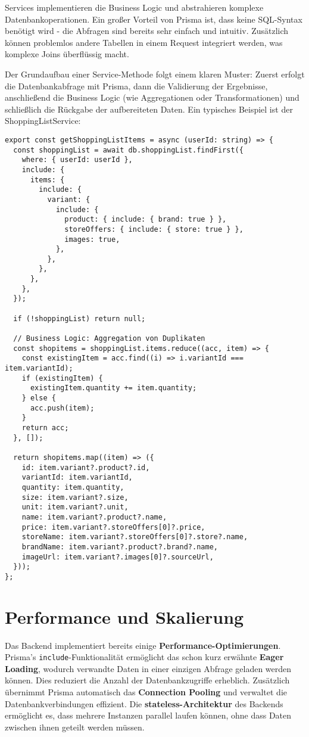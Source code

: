 Services implementieren die Business Logic und abstrahieren komplexe Datenbankoperationen. Ein großer Vorteil von Prisma ist, dass keine SQL-Syntax benötigt wird - die Abfragen sind bereits sehr einfach und intuitiv. Zusätzlich können problemlos andere Tabellen in einem Request integriert werden, was komplexe Joins überflüssig macht.

Der Grundaufbau einer Service-Methode folgt einem klaren Muster: Zuerst erfolgt die Datenbankabfrage mit Prisma, dann die Validierung der Ergebnisse, anschließend die Business Logic (wie Aggregationen oder Transformationen) und schließlich die Rückgabe der aufbereiteten Daten. Ein typisches Beispiel ist der ShoppingListService:

\begin{lstlisting}[style=typescriptstyle,caption={Service-Layer Beispiel}]
export const getShoppingListItems = async (userId: string) => {
  const shoppingList = await db.shoppingList.findFirst({
    where: { userId: userId },
    include: {
      items: {
        include: {
          variant: {
            include: {
              product: { include: { brand: true } },
              storeOffers: { include: { store: true } },
              images: true,
            },
          },
        },
      },
    },
  });

  if (!shoppingList) return null;

  // Business Logic: Aggregation von Duplikaten
  const shopitems = shoppingList.items.reduce((acc, item) => {
    const existingItem = acc.find((i) => i.variantId === item.variantId);
    if (existingItem) {
      existingItem.quantity += item.quantity;
    } else {
      acc.push(item);
    }
    return acc;
  }, []);

  return shopitems.map((item) => ({
    id: item.variant?.product?.id,
    variantId: item.variantId,
    quantity: item.quantity,
    size: item.variant?.size,
    unit: item.variant?.unit,
    name: item.variant?.product?.name,
    price: item.variant?.storeOffers[0]?.price,
    storeName: item.variant?.storeOffers[0]?.store?.name,
    brandName: item.variant?.product?.brand?.name,
    imageUrl: item.variant?.images[0]?.sourceUrl,
  }));
};
\end{lstlisting}

\section{Performance und Skalierung}

Das Backend implementiert bereits einige \textbf{Performance-Optimierungen}. Prisma's \texttt{include}-Funktionalität ermöglicht das schon kurz erwähnte \textbf{Eager Loading}, wodurch verwandte Daten in einer einzigen Abfrage geladen werden können. Dies reduziert die Anzahl der Datenbankzugriffe erheblich. Zusätzlich übernimmt Prisma automatisch das \textbf{Connection Pooling} und verwaltet die Datenbankverbindungen effizient. Die \textbf{stateless-Architektur} des Backends ermöglicht es, dass mehrere Instanzen parallel laufen können, ohne dass Daten zwischen ihnen geteilt werden müssen.

